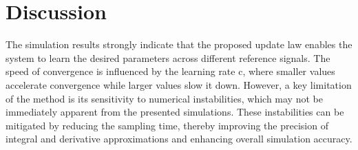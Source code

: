 \section{Discussion}
\label{sec:conclusion}

The simulation results strongly indicate that the proposed update law enables the system to learn the desired parameters across different reference signals. The speed of convergence is influenced by the learning rate c, where smaller values accelerate convergence while larger values slow it down. However, a key limitation of the method is its sensitivity to numerical instabilities, which may not be immediately apparent from the presented simulations. These instabilities can be mitigated by reducing the sampling time, thereby improving the precision of integral and derivative approximations and enhancing overall simulation accuracy.



